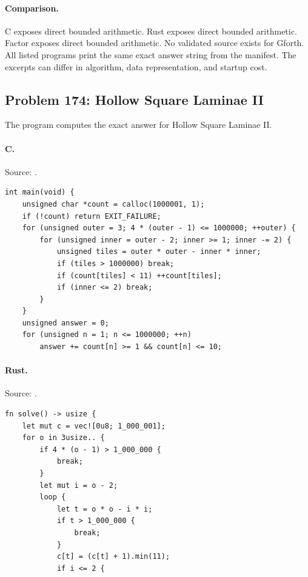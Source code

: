 \paragraph{Comparison.}
C exposes direct bounded arithmetic. Rust exposes direct bounded arithmetic. Factor exposes direct bounded arithmetic.
No validated source exists for Gforth.
All listed programs print the same exact answer string from the manifest. The excerpts can differ in algorithm, data representation, and startup cost.

\subsection{Problem 174: Hollow Square Laminae II}
\label{walkthrough:p174}
The program computes the exact answer for Hollow Square Laminae II.

\paragraph{C.} Source: .
\begin{lstlisting}
int main(void) {
    unsigned char *count = calloc(1000001, 1);
    if (!count) return EXIT_FAILURE;
    for (unsigned outer = 3; 4 * (outer - 1) <= 1000000; ++outer) {
        for (unsigned inner = outer - 2; inner >= 1; inner -= 2) {
            unsigned tiles = outer * outer - inner * inner;
            if (tiles > 1000000) break;
            if (count[tiles] < 11) ++count[tiles];
            if (inner <= 2) break;
        }
    }
    unsigned answer = 0;
    for (unsigned n = 1; n <= 1000000; ++n)
        answer += count[n] >= 1 && count[n] <= 10;
\end{lstlisting}

\paragraph{Rust.} Source: .
\begin{lstlisting}
fn solve() -> usize {
    let mut c = vec![0u8; 1_000_001];
    for o in 3usize.. {
        if 4 * (o - 1) > 1_000_000 {
            break;
        }
        let mut i = o - 2;
        loop {
            let t = o * o - i * i;
            if t > 1_000_000 {
                break;
            }
            c[t] = (c[t] + 1).min(11);
            if i <= 2 {
\end{lstlisting}

